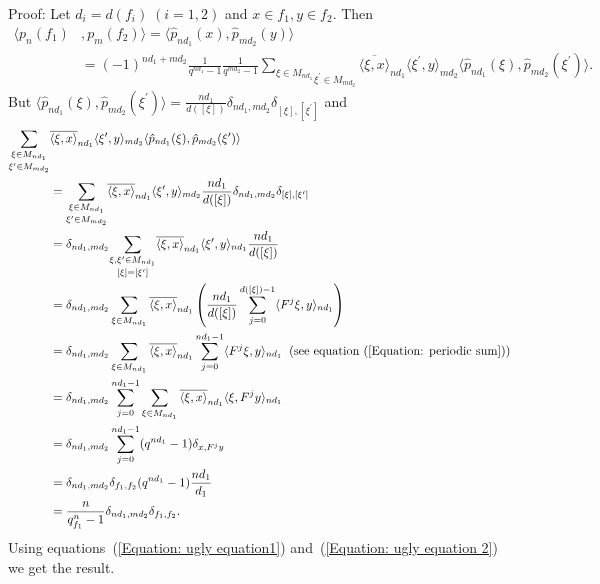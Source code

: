 Proof: Let $d_i = d(f_i)\;(i=1,2)$ and $x\in f_1, y\in f_2$. Then
\begin{equation}\label{Equation: ugly equation1}
    \begin{split}
        \langle p_n(f_1)&,p_m(f_2) \rangle = \langle \hat{p}_{nd_1}(x),\hat{p}_{md_2}(y)\rangle\\
        &=(-1)^{nd_1+md_2}\frac{1}{q^{nd_1}-1}\frac{1}{q^{md_2}-1}\underset{\xi^\prime\in M_{md_2}}{\sum_{\xi\in M_{nd_1}}}\overline{\langle\xi, x\rangle}_{nd_1}\langle\xi^\prime,y\rangle_{md_2}\langle\hat{p}_{nd_1}(\xi),\hat{p}_{md_2}(\xi^\prime)\rangle.
    \end{split}
\end{equation}
But $\langle\hat{p}_{nd_1}(\xi),\hat{p}_{md_2}(\xi^\prime)\rangle=\frac{nd_1}{d([\xi])}\delta_{nd_1,md_2}\delta_{[\xi],[\xi^\prime]}$ and
\begin{equation}\label{Equation: ugly equation 2}
    \begin{split}
        \underset{\xi^\prime\in M_{md_2}}{\sum_{\xi\in M_{nd_1}}}&\overline{\langle\xi, x\rangle}_{nd_1}\langle\xi^\prime,y\rangle_{md_2}\langle\hat{p}_{nd_1}(\xi),\hat{p}_{md_2}(\xi^\prime)\rangle \\
        &=\underset{\xi^\prime\in M_{md_2}}{\sum_{\xi\in M_{nd_1}}}\overline{\langle\xi, x\rangle}_{nd_1}\langle\xi^\prime,y\rangle_{md_2}\frac{nd_1}{d([\xi])}\delta_{nd_1,md_2}\delta_{[\xi],[\xi^\prime]}\\
        &=\delta_{nd_1,md_2}\underset{[\xi]=[\xi^\prime]}{\sum_{\xi,\xi^\prime\in M_{nd_1}}}\overline{\langle\xi, x\rangle}_{nd_1}\langle\xi^\prime,y\rangle_{nd_1}\frac{nd_1}{d([\xi])}\\
        &=\delta_{nd_1,md_2}\sum_{\xi\in M_{nd_1}}\overline{\langle\xi, x\rangle}_{nd_1}\left(\frac{nd_1}{d([\xi])}\sum_{j=0}^{d([\xi])-1}\langle F^j\xi, y\rangle_{nd_1}\right)\\
        &=\delta_{nd_1,md_2}\sum_{\xi\in M_{nd_1}}\overline{\langle\xi, x\rangle}_{nd_1}\sum_{j=0}^{nd_1-1}\langle F^j\xi,y\rangle_{nd_1}\;\;(\text{see equation~(\ref{Equation: periodic sum})})\\
        &=\delta_{nd_1,md_2}\sum_{j=0}^{nd_1-1}\sum_{\xi\in M_{nd_1}}\overline{\langle\xi,x\rangle}_{nd_1}\langle\xi,F^jy\rangle_{nd_1}\\
        &=\delta_{nd_1,md_2}\sum_{j=0}^{nd_1-1}(q^{nd_1}-1)\delta_{x, F^jy}\\
        &=\delta_{nd_1,md_2}\delta_{f_1,f_2}(q^{nd_1}-1)\frac{nd_1}{d_1}\\
        &=\frac{n}{q_{f_1}^n-1}\delta_{nd_1,md_2}\delta_{f_1,f_2}.
    \end{split}
\end{equation}
Using equations~(\ref{Equation: ugly equation1}) and~(\ref{Equation: ugly equation 2}) we get the result.

